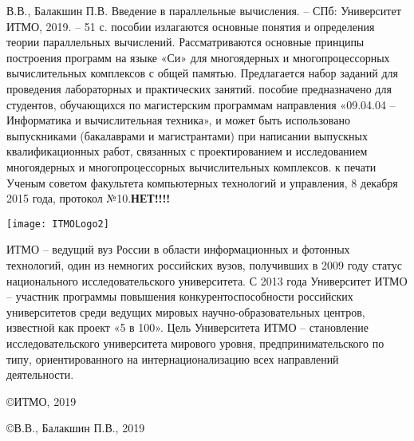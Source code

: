 { %
	\thispagestyle{empty} %
	\Large{} В.В., Балакшин П.В. Введение в параллельные вычисления. – СПб: Университет ИТМО, 2019. – 51 с.
	\newline
	\newline
	 пособии излагаются основные понятия и определения теории параллельных вычислений. Рассматриваются основные принципы построения программ на языке «Си» для многоядерных и многопроцессорных вычислительных комплексов с общей памятью. Предлагается набор заданий для проведения лабораторных и практических занятий.
	\newline
	\newline
	 пособие предназначено для студентов, обучающихся по магистерским программам направления «09.04.04 – Информатика и вычислительная техника», и может быть использовано выпускниками (бакалаврами и магистрантами) при написании выпускных квалификационных работ, связанных с проектированием и исследованием многоядерных и многопроцессорных вычислительных комплексов.
	\newline
	\newline
	 к печати Ученым советом факультета компьютерных технологий и управления, 8 декабря 2015 года, протокол №10.\textbf{НЕТ!!!!}
	\vspace*{\fill} %
	\begin{flushright}
		\texttt{[image: ITMOLogo2]}
	\end{flushright}
	 ИТМО – ведущий вуз России в области информационных и фотонных технологий, один из немногих российских вузов, получивших в 2009 году статус национального исследовательского университета. С 2013 года Университет ИТМО – участник программы повышения конкурентоспособности российских университетов среди ведущих мировых научно-образовательных центров, известной как проект «5 в 100». Цель Университета ИТМО – становление исследовательского университета мирового уровня, предпринимательского по типу, ориентированного на интернационализацию всех направлений деятельности.
	\begin{flushright}
		\copyright{} ИТМО, 2019
		\par\copyright{} В.В., Балакшин П.В., 2019
	\end{flushright}
}